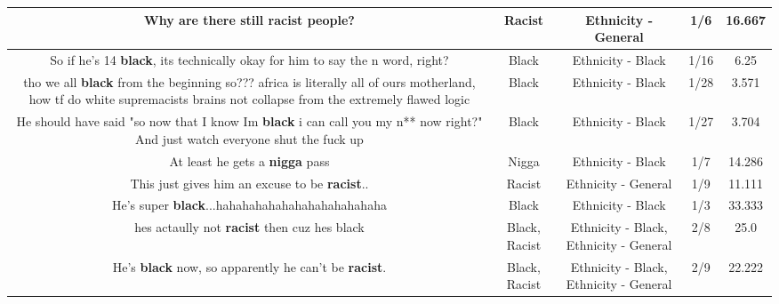 \documentclass[11pt]{article}
\newlength\mylength
\begin{document}
\begin{center}
\begin{longtable}{|C{.65\mylength}|C{.30\mylength}|C{.12\mylength}|C{.12\mylength}|C{.12\mylength}|}
  \small Why are there still \textbf{racist} people?\normalsize   & Racist & Ethnicity - General & 1/6 & 16.667 \\  \hline
  \small So if he's 14 \textbf{black}, its technically okay for him to say the n word, right?\normalsize   & Black & Ethnicity - Black & 1/16 & 6.25 \\  \hline
  \small tho we all \textbf{black} from the beginning so??? africa is literally all of ours motherland, how tf do white supremacists brains not collapse from the extremely flawed logic\normalsize   & Black & Ethnicity - Black & 1/28 & 3.571 \\  \hline
  \small He should have said "so now that I know Im \textbf{black} i can call you my n** now right?" And just watch everyone shut the fuck up\normalsize   & Black & Ethnicity - Black & 1/27 & 3.704 \\  \hline
  \small At least he gets a \textbf{nigga} pass\normalsize   & Nigga & Ethnicity - Black & 1/7 & 14.286 \\  \hline
  \small This just gives him an excuse to be \textbf{racist}..\normalsize   & Racist & Ethnicity - General & 1/9 & 11.111 \\  \hline
  \small He's super \textbf{black}...hahahahahahahahahahahahaha\normalsize   & Black & Ethnicity - Black & 1/3 & 33.333 \\  \hline
  \small hes actaully not \textbf{racist} then cuz hes black\normalsize   & Black, Racist & Ethnicity - Black, Ethnicity - General & 2/8 & 25.0 \\  \hline
  \small He's \textbf{black} now, so apparently he can't be \textbf{racist}.\normalsize   & Black, Racist & Ethnicity - Black, Ethnicity - General & 2/9 & 22.222 \\  \hline

\end{longtable}
\end{center}
\end{document}
